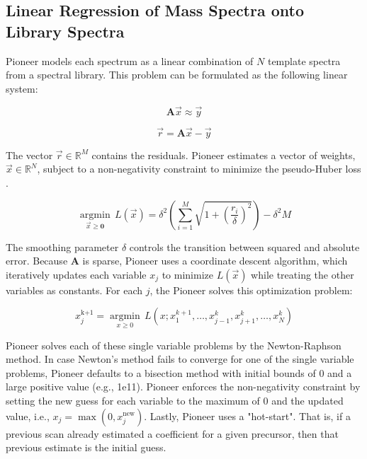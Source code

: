 \documentclass[pdflatex,sn-nature]{sn-jnl}
\begin{document}
\subsection{Linear Regression of Mass Spectra onto Library Spectra}\label{sec:linear_regression}
Pioneer models each spectrum as a linear combination of $N$ template spectra from a spectral library. This problem can be formulated as the following linear system: 

\begin{equation}
    \mathbf{A}\vec{x} \approx \vec{y}
\end{equation}

\begin{equation}
   \vec{r} = \mathbf{A}\vec{x} - \vec{y}
\end{equation}

The vector $\vec{r} \in \mathbb{R}^{M}$ contains the residuals. Pioneer estimates a vector of weights, $\vec{x} \in \mathbb{R}^{N}$, subject to a non-negativity constraint to minimize the pseudo-Huber loss \cite{Charbonnier1997-wc, Gokcesu2021-tz}.

\begin{equation}
\underset{\vec{x} \geq  \mathbf{0}}{\operatorname{argmin}}\,  L(\vec{x}) = \delta^2\left(\sum\limits_{i=1}^{M}\sqrt{
1 + \left(\frac{r_{i}}{\delta}\right)^{2}
}\right) - \delta^{2}M
\end{equation}

The smoothing parameter $\delta$ controls the transition between squared and absolute error. Because $\mathbf{A}$ is sparse, Pioneer uses a coordinate descent algorithm, which iteratively updates each variable $x_j$ to minimize $L(\vec{x})$ while treating the other variables as constants. For each $j$, the Pioneer solves this optimization problem:

\begin{equation}
x_j^{\text{k+1}} = \underset{x \geq 0}{\operatorname{argmin}} \, L(x; x_{1}^{k+1},\dots,x_{j-1}^{k},x_{j+1}^{k}, \dots, x_{N}^{k})
\end{equation}

Pioneer solves each of these single variable problems by the Newton-Raphson method. In case Newton's method fails to converge for one of the single variable problems, Pioneer defaults to a bisection method with initial bounds of 0 and a large positive value (e.g., 1e11).  Pioneer enforces the non-negativity constraint by setting the new guess for each variable to the maximum of 0 and the updated value, i.e., $x_j = \max(0, x_j^{\text{new}})$. Lastly, Pioneer uses a "hot-start". That is, if a previous scan already estimated a coefficient for a given precursor, then that previous estimate is the initial guess.
\end{document}
